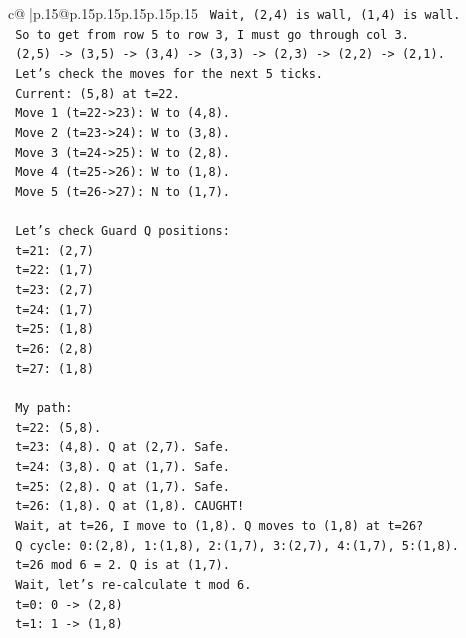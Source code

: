 \documentclass{article}
\begin{document}
{\begin{supertabular}{c@{$\;$}|p{.15\linewidth}@{}p{.15\linewidth}p{.15\linewidth}p{.15\linewidth}p{.15\linewidth}p{.15\linewidth}}
{{{\texttt{   Wait, (2,4) is wall, (1,4) is wall.} \\
\texttt{   So to get from row 5 to row 3, I must go through col 3.} \\
\texttt{   (2,5) {-}> (3,5) {-}> (3,4) {-}> (3,3) {-}> (2,3) {-}> (2,2) {-}> (2,1).} \\
\texttt{   Let's check the moves for the next 5 ticks.} \\
\texttt{   Current: (5,8) at t=22.} \\
\texttt{   Move 1 (t=22{-}>23): W to (4,8).} \\
\texttt{   Move 2 (t=23{-}>24): W to (3,8).} \\
\texttt{   Move 3 (t=24{-}>25): W to (2,8).} \\
\texttt{   Move 4 (t=25{-}>26): W to (1,8).} \\
\texttt{   Move 5 (t=26{-}>27): N to (1,7).} \\
\\ 
\texttt{   Let's check Guard Q positions:} \\
\texttt{   t=21: (2,7)} \\
\texttt{   t=22: (1,7)} \\
\texttt{   t=23: (2,7)} \\
\texttt{   t=24: (1,7)} \\
\texttt{   t=25: (1,8)} \\
\texttt{   t=26: (2,8)} \\
\texttt{   t=27: (1,8)} \\
\\ 
\texttt{   My path:} \\
\texttt{   t=22: (5,8).} \\
\texttt{   t=23: (4,8). Q at (2,7). Safe.} \\
\texttt{   t=24: (3,8). Q at (1,7). Safe.} \\
\texttt{   t=25: (2,8). Q at (1,7). Safe.} \\
\texttt{   t=26: (1,8). Q at (1,8). CAUGHT!} \\
\texttt{   Wait, at t=26, I move to (1,8). Q moves to (1,8) at t=26?} \\
\texttt{   Q cycle: 0:(2,8), 1:(1,8), 2:(1,7), 3:(2,7), 4:(1,7), 5:(1,8).} \\
\texttt{   t=26 mod 6 = 2. Q is at (1,7).} \\
\texttt{   Wait, let's re{-}calculate t mod 6.} \\
\texttt{   t=0: 0 {-}> (2,8)} \\
\texttt{   t=1: 1 {-}> (1,8)} \\
}}}
\end{supertabular}}
\end{document}
